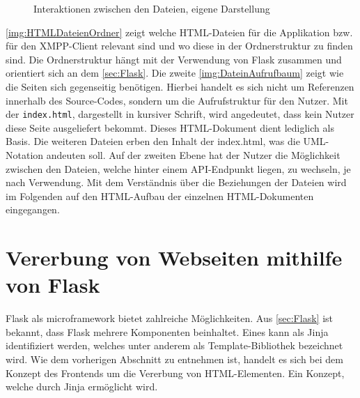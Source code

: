 \documentclass[a4paper,titlepage,halfparskip,12pt]{scrreprt}
\begin{document}
\begin{onehalfspacing}
\begin{figure}[h]
\begin{minipage}[c]{.5\textwidth}
		\caption{Interaktionen zwischen den Dateien, eigene Darstellung}
		\label{img:DateinAufrufbaum}
	\end{minipage}
\end{figure}
\autoref{img:HTMLDateienOrdner} zeigt welche HTML-Dateien für die Applikation bzw. für den XMPP-Client relevant sind und wo diese in der Ordnerstruktur zu finden sind. Die Ordnerstruktur hängt mit der Verwendung von Flask zusammen und orientiert sich an dem \autoref{sec:Flask}. Die zweite \autoref{img:DateinAufrufbaum} zeigt wie die Seiten sich gegenseitig benötigen. Hierbei handelt es sich nicht um Referenzen innerhalb des Source-Codes, sondern um die Aufrufstruktur für den Nutzer. Mit der \texttt{index.html}, dargestellt in kursiver Schrift, wird angedeutet, dass kein Nutzer diese Seite ausgeliefert bekommt. Dieses \ac{HTML}-Dokument dient lediglich als Basis. Die weiteren Dateien erben den Inhalt der index.html, was die UML-Notation andeuten soll. Auf der zweiten Ebene hat der Nutzer die Möglichkeit zwischen den Dateien, welche hinter einem API-Endpunkt liegen, zu wechseln, je nach Verwendung. Mit dem Verständnis über die Beziehungen der Dateien wird im Folgenden auf den \ac{HTML}-Aufbau der einzelnen HTML-Dokumenten eingegangen.

\section{Vererbung von Webseiten mithilfe von Flask}
\label{subsec:TemplateInheritance}
Flask als microframework bietet zahlreiche Möglichkeiten. Aus \autoref{sec:Flask} ist bekannt, dass Flask mehrere Komponenten beinhaltet. Eines kann als Jinja identifiziert werden, welches unter anderem als Template-Bibliothek bezeichnet wird. Wie dem vorherigen Abschnitt zu entnehmen ist, handelt es sich bei dem Konzept des Frontends um die Vererbung von HTML-Elementen. Ein Konzept, welche durch Jinja ermöglicht wird.


\end{onehalfspacing}
\end{document}

